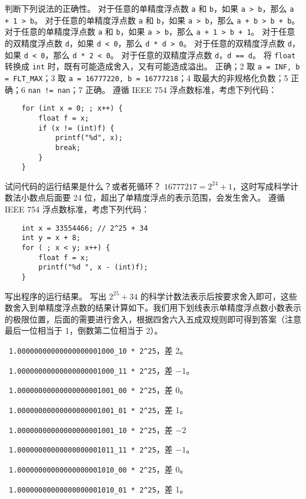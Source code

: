 \begin{problems}
		\pro 判断下列说法的正确性。
			\qn 对于任意的单精度浮点数 \texttt{a} 和 \texttt{b}，如果 \texttt{a > b}，那么 \texttt{a + 1 > b}。
			\qn 对于任意的单精度浮点数 \texttt{a} 和 \texttt{b}，如果 \texttt{a > b}，那么 \texttt{a + b > b + b}。
			\qn 对于任意的单精度浮点数 \texttt{a} 和 \texttt{b}，如果 \texttt{a > b}，那么 \texttt{a + 1 > b + 1}。
			\qn 对于任意的双精度浮点数 \texttt{d}，如果 \texttt{d < 0}，那么 \texttt{d * d > 0}。
			\qn 对于任意的双精度浮点数 \texttt{d}，如果 \texttt{d < 0}，那么 \texttt{d * 2 < 0}。
			\qn 对于任意的双精度浮点数 \texttt{d}，\texttt{d == d}。
			\qn 将 \texttt{float} 转换成 \texttt{int} 时，既有可能造成舍入，又有可能造成溢出。
		 正确；2 取 \verb|a = INF, b = FLT_MAX|；3 取 \verb|a = 16777220, b = 16777218|；4 取最大的非规格化负数；5 正确；6 \verb|nan != nan|；7 正确。
		\pro 遵循 IEEE 754 浮点数标准，考虑下列代码：
		\begin{verbatim}
    for (int x = 0; ; x++) {
        float f = x;
        if (x != (int)f) {
            printf("%d", x);
            break;
        }
    }
		\end{verbatim}
		试问代码的运行结果是什么？或者死循环？
		\sol $16777217=2^{24}+1$，这时写成科学计数法小数点后面要 24 位，超出了单精度浮点的表示范围，会发生舍入。
		\pro 遵循 IEEE 754 浮点数标准，考虑下列代码：
		\begin{verbatim}
    int x = 33554466; // 2^25 + 34
    int y = x + 8;
    for ( ; x < y; x++) {
        float f = x;
        printf("%d ", x - (int)f);
    }
		\end{verbatim}
		写出程序的运行结果。
		\sol 写出 $2^{25}+34$ 的科学计数法表示后按要求舍入即可，这些数舍入到单精度浮点数的结果计算如下。我们用下划线表示单精度浮点数小数表示的极限位置，后面的需要进行舍入，根据四舍六入五成双规则即可得到答案（注意最后一位相当于 1，倒数第二位相当于 2）。
		\begin{compactenum}
			\item \ \verb|1.00000000000000000001000_10 * 2^25|，差 2。
			\item \ \verb|1.00000000000000000001000_11 * 2^25|，差 $-1$。
			\item \ \verb|1.00000000000000000001001_00 * 2^25|，差 0。
			\item \ \verb|1.00000000000000000001001_01 * 2^25|，差 1。
			\item \ \verb|1.00000000000000000001001_10 * 2^25|，差 $-2$
			\item \ \verb|1.00000000000000000001011_11 * 2^25|，差 $-1$。
			\item \ \verb|1.00000000000000000001010_00 * 2^25|，差 0。
			\item \ \verb|1.00000000000000000001010_01 * 2^25|，差 1。
		\end{compactenum}
	\end{problems}

